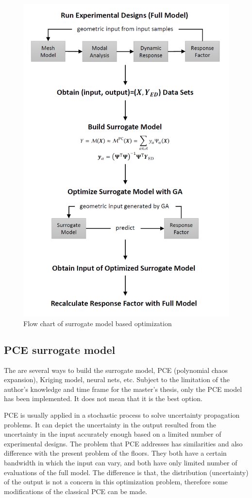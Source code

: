 \begin{figure}[H]
\centering
\includegraphics[width=.7\textwidth]{images/opt_flowchart}
\caption{Flow chart of surrogate model based optimization}
\label{fig:opt_flowchart}
\end{figure}

\subsection{PCE surrogate model}
The are several ways to build the surrogate model, PCE (polynomial chaos expansion), Kriging model, neural nets, etc. Subject to the limitation of the author's knowledge and time frame for the master's thesis, only the PCE model has been implemented. It does not mean that it is the best option.

PCE is usually applied in a stochastic process to solve uncertainty propagation problems. It can depict the uncertainty in the output resulted from the uncertainty in the input accurately  enough based on a limited number of experimental designs. The problem that PCE addresses has similarities and also difference with the present problem of the floors. They both have a certain bandwidth in which the input can vary, and both have only limited number of evaluations of the full model. The difference is that, the distribution (uncertainty) of the output is not a concern in this optimization problem, therefore some modifications of the classical PCE can be made.

